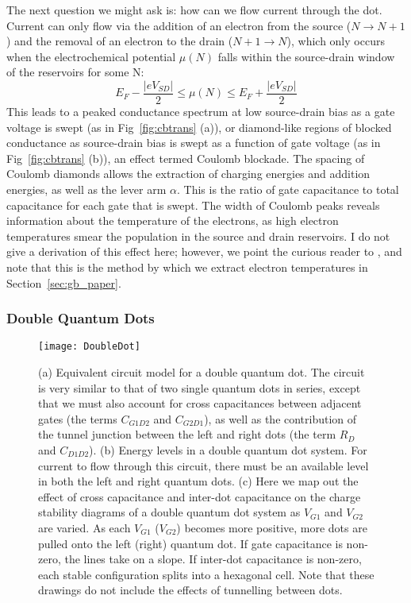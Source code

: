 The next question we might ask is: how can we flow current through the dot. Current can only flow via the addition of an electron
from the source ($N \rightarrow N+1$) and the removal of an electron to the drain ($N+1 \rightarrow N$), which only occurs
when the electrochemical potential $\mu(N)$ falls within the source-drain window of the reservoirs for some N:
\begin{equation}
  E_F - \frac{|eV_{SD}|}{2} \leq \mu(N) \leq E_F + \frac{|eV_{SD}|}{2}
\end{equation}
This leads to a peaked conductance spectrum at low source-drain bias as a gate voltage is swept (as in Fig~\ref{fig:cbtrans} (a)), or
diamond-like regions of blocked conductance as source-drain bias is swept as a function of gate voltage (as in Fig~\ref{fig:cbtrans} (b)),
an effect termed Coulomb blockade. The spacing of Coulomb diamonds allows the extraction of charging energies and addition energies, as
well as the lever arm $\alpha$. This is the ratio of gate capacitance to total capacitance for each gate that is swept. The width of Coulomb
peaks reveals information about the temperature of the electrons, as high electron temperatures smear the population in
the source and drain reservoirs. I do not give a derivation of this effect here; however, we point the curious reader to \cite{grabert2013single},
and note that this is the method by which we extract electron temperatures in Section~\ref{sec:gb_paper}.

\subsubsection{Double Quantum Dots}
\begin{figure}
  \texttt{[image: DoubleDot]}
  \caption[Schematic of a double quantum dot]
  {\label{fig:dqd}(a) Equivalent circuit model for a double quantum dot. The circuit is very similar to that of
  two single quantum dots in series, except that we must also account for cross capacitances between adjacent gates
  (the terms $C_{G1D2}$ and $C_{G2D1}$), as well as the contribution of the tunnel junction between the left and
  right dots (the term $R_D$ and $C_{D1D2}$). (b) Energy levels in a double quantum dot system. For current to flow
  through this circuit, there must be an available level in both the left and right quantum dots. (c) Here we map
  out the effect of cross capacitance and inter-dot capacitance on the charge stability diagrams of a double quantum
  dot system as $V_{G1}$ and $V_{G2}$ are varied. As each $V_{G1}$ ($V_{G2}$) becomes more positive, more dots are
  pulled onto the left (right) quantum dot. If gate capacitance is non-zero, the lines take on a slope. If inter-dot
  capacitance is non-zero, each stable configuration splits into a hexagonal cell. Note that these drawings do
  not include the effects of tunnelling between dots.}
\end{figure}


